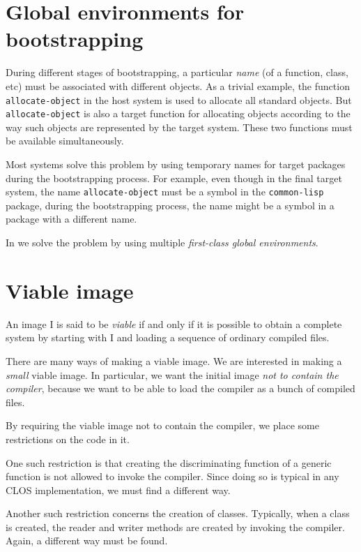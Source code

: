 \section{Global environments for bootstrapping}

During different stages of bootstrapping, a particular \emph{name} (of
a function, class, etc) must be associated with different objects.  As
a trivial example, the function \texttt{allocate-object} in the host
system is used to allocate all standard objects.  But
\texttt{allocate-object} is also a target function for allocating
objects according to the way such objects are represented by the
target system.  These two functions must be available simultaneously.

Most systems solve this problem by using temporary names for target
packages during the bootstrapping process.  For example, even though
in the final target system, the name \texttt{allocate-object} must be
a symbol in the \texttt{common-lisp} package, during the bootstrapping
process, the name might be a symbol in a package with a different
name.

In \sysname{} we solve the problem by using multiple \emph{first-class
  global environments}.

\section{Viable image}
\label{sec-bootstrapping-viable-image}

An image I is said to be \emph{viable} if and only if it is possible
to obtain a complete \commonlisp{} system by starting with I and loading a
sequence of ordinary compiled files.

There are many ways of making a viable image.  We are interested in
making a \emph{small} viable image.  In particular, we want the
initial image \emph{not to contain the compiler}, because we want to
be able to load the compiler as a bunch of compiled files. 

By requiring the viable image not to contain the compiler, we place
some restrictions on the code in it.  

One such restriction is that creating the discriminating function of a
generic function is not allowed to invoke the compiler.  Since doing
so is typical in any CLOS implementation, we must find a different
way.

Another such restriction concerns the creation of classes.  Typically,
when a class is created, the reader and writer methods are created by
invoking the compiler.  Again, a different way must be found.

